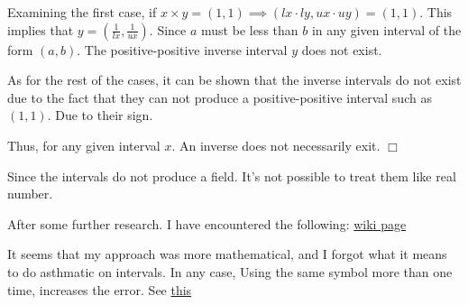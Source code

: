 \documentclass[12pt]{article}
\begin{document}
Examining the first case, if \( x \times y = (1 ,1) \implies (lx \cdot
ly , ux \cdot uy) = (1 , 1) \). This implies that \( y =
(\frac{1}{lx} , \frac{1}{ux})\). Since \( a \) must be less than \(
b \) in any given interval of the form \( (a , b) \). The
positive-positive inverse interval \( y \) does not exist. 

As for the rest of the cases, it can be shown that the inverse intervals
do not exist due to the fact that they can not produce a
positive-positive interval such as \( (1 , 1) \). Due to their sign.

Thus, for any given interval \( x \). An inverse does not necessarily 
exit.
\hfill \( \Box \)

Since the intervals do not produce a field. It's not possible to treat
them like real number. 

After some further research. I have encountered the following:
\href{https://en.wikipedia.org/wiki/Interval_arithmetic#Dependency_problem}{wiki page}

It seems that my approach was more mathematical, and I forgot what it
means to do asthmatic on intervals. In any case, Using the same symbol
more than one time, increases the error. See
\href{https://stackoverflow.com/questions/14130878/sicp-2-16-interval-arithmetic-scheme}{this}
\end{document}
